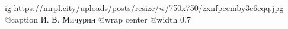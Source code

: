  
 
 
 
 

\ifcmt
  ig https://mrpl.city/uploads/posts/resize/w/750x750/zxnfpeemby3c6eqq.jpg
	@caption И. В. Мичурин
  @wrap center
  @width 0.7
\fi

